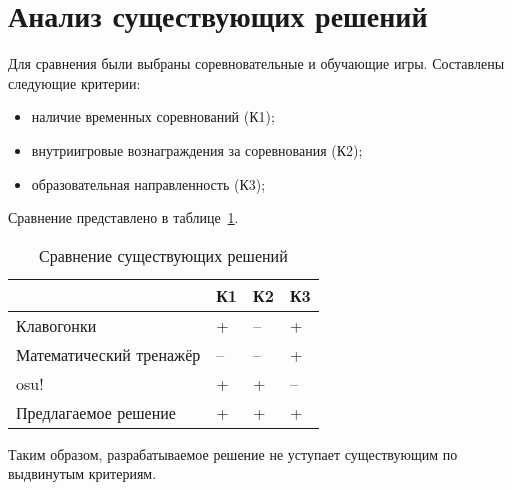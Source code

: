 



\section{Анализ существующих решений}

Для сравнения были выбраны соревновательные и обучающие игры. Составлены следующие критерии:
\begin{itemize}
	\item наличие временных соревнований (К1);
	\item внутриигровые вознаграждения за соревнования (К2);
	\item образовательная направленность (К3);
\end{itemize}

Сравнение представлено в таблице~\ref{tbl:comparison}. 

\begin{table}[h!]
	\centering
	\caption{\label{tbl:comparison}Сравнение существующих решений}
	\begin{tabular}{|l|l|l|l|}
		\hline
		& К1 & К2 & К3 \\\hline
		Клавогонки & + & -- & +\\\hline
		Математический тренажёр & -- & -- & +\\\hline
		osu!  & + & + & --\\\hline
		Предлагаемое решение & + & + & + \\\hline
	\end{tabular}
\end{table}
\FloatBarrier

Таким образом, разрабатываемое решение не уступает существующим по выдвинутым критериям.

